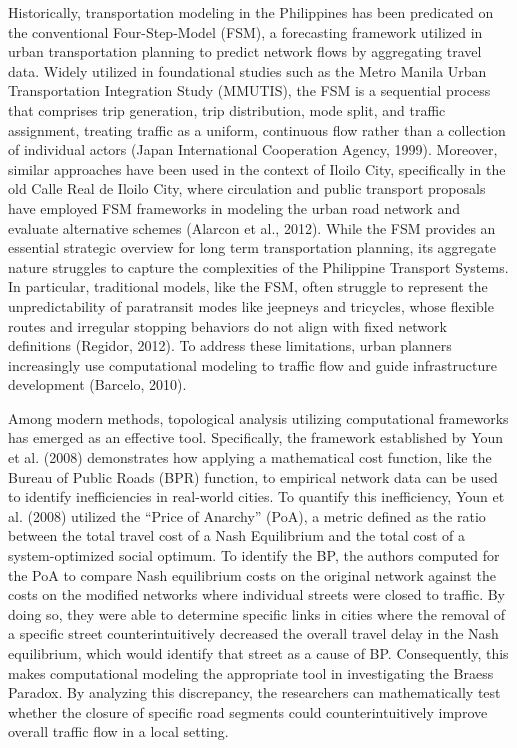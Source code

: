 Historically, transportation modeling in the Philippines has been predicated on the conventional Four-Step-Model (FSM), a forecasting framework utilized in urban transportation planning to predict network flows by aggregating travel data. Widely utilized in foundational studies such as the Metro Manila Urban Transportation Integration Study (MMUTIS), the FSM is a sequential process that comprises trip generation, trip distribution, mode split, and traffic assignment, treating traffic as a uniform, continuous flow rather than a collection of individual actors (Japan International Cooperation Agency, 1999).  Moreover, similar approaches have been used in the context of Iloilo City, specifically in the old Calle Real de Iloilo City, where circulation and public transport proposals have employed FSM frameworks in modeling the urban road network and evaluate alternative schemes (Alarcon et al., 2012). While the FSM provides an essential strategic overview for long term transportation planning, its aggregate nature struggles to capture the complexities of the Philippine Transport Systems. In particular, traditional models, like the FSM, often struggle to represent the unpredictability of paratransit modes like jeepneys and tricycles, whose flexible routes and irregular stopping behaviors do not align with fixed network definitions (Regidor, 2012). To address these limitations, urban planners increasingly use computational modeling to traffic flow and guide infrastructure development (Barcelo, 2010). 

Among modern methods, topological analysis utilizing computational frameworks has emerged as an effective tool. Specifically, the framework established by Youn et al. (2008) demonstrates how applying a mathematical cost function, like the Bureau of Public Roads (BPR) function, to empirical network data can be used to identify inefficiencies in real-world cities. To quantify this inefficiency, Youn et al. (2008) utilized the “Price of Anarchy” (PoA), a metric defined as the ratio between the total travel cost of a Nash Equilibrium and the total cost of a system-optimized social optimum. To identify the BP, the authors computed for the PoA to compare Nash equilibrium costs on the original network against the costs on the modified networks where individual streets were closed to traffic. By doing so, they were able to determine specific links in cities where the removal of a specific street counterintuitively decreased the overall travel delay in the Nash equilibrium, which would identify that street as a cause of BP. Consequently, this makes computational modeling the appropriate tool in investigating the Braess Paradox. By analyzing this discrepancy, the researchers can mathematically test whether the closure of specific road segments could counterintuitively improve overall traffic flow in a local setting. 
    
